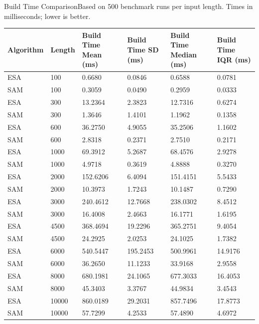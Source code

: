 \begin{benchmarktable}{Build Time Comparison}{Based on 500 benchmark runs per input length. Times in milliseconds; lower is better.}
\begin{tabularx}{\textwidth}{|X|X|X|X|X|X|}
\toprule
Algorithm & Length & Build Time Mean (ms) & Build Time SD (ms) & Build Time Median (ms) & Build Time IQR (ms) \\
\midrule
ESA & 100 & 0.6680 & 0.0846 & 0.6588 & 0.0781 \\
SAM & 100 & 0.3059 & 0.0490 & 0.2959 & 0.0333 \\
\hline
ESA & 300 & 13.2364 & 2.3823 & 12.7316 & 0.6274 \\
SAM & 300 & 1.3646 & 1.4101 & 1.1962 & 0.1358 \\
\hline
ESA & 600 & 36.2750 & 4.9055 & 35.2506 & 1.1602 \\
SAM & 600 & 2.8318 & 0.2371 & 2.7510 & 0.2171 \\
\hline
ESA & 1000 & 69.3912 & 5.2687 & 68.4576 & 2.9278 \\
SAM & 1000 & 4.9718 & 0.3619 & 4.8888 & 0.3270 \\
\hline
ESA & 2000 & 152.6206 & 6.4094 & 151.4151 & 5.5433 \\
SAM & 2000 & 10.3973 & 1.7243 & 10.1487 & 0.7290 \\
\hline
ESA & 3000 & 240.4612 & 12.7668 & 238.0302 & 8.4512 \\
SAM & 3000 & 16.4008 & 2.4663 & 16.1771 & 1.6195 \\
\hline
ESA & 4500 & 368.4694 & 19.2296 & 365.2751 & 9.4054 \\
SAM & 4500 & 24.2925 & 2.0253 & 24.1025 & 1.7382 \\
\hline
ESA & 6000 & 540.5447 & 195.2453 & 500.9961 & 14.9176 \\
SAM & 6000 & 36.2650 & 11.1233 & 33.9168 & 2.9558 \\
\hline
ESA & 8000 & 680.1981 & 24.1065 & 677.3033 & 16.4053 \\
SAM & 8000 & 45.3403 & 3.3767 & 44.9834 & 3.4543 \\
\hline
ESA & 10000 & 860.0189 & 29.2031 & 857.7496 & 17.8773 \\
SAM & 10000 & 57.7299 & 4.2533 & 57.4890 & 4.6972 \\
\bottomrule
\end{tabularx}
\end{benchmarktable}


